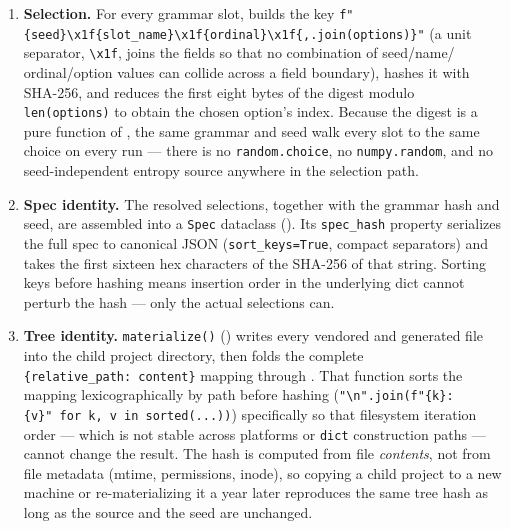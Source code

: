 \documentclass[
]{article}
\providecommand{\tightlist}{%
  \setlength{\itemsep}{0pt}\setlength{\parskip}{0pt}}
\begin{document}
\begin{enumerate}
\def\labelenumi{\arabic{enumi}.}
\tightlist
\item
  \textbf{Selection.} For every grammar slot,
   builds the key
  \texttt{f"\{seed\}\textbackslash{}x1f\{slot\_name\}\textbackslash{}x1f\{ordinal\}\textbackslash{}x1f\{\textquotesingle{},\textquotesingle{}.join(options)\}"}
  (a unit separator, \texttt{\textbackslash{}x1f}, joins the fields so
  that no combination of seed/name/ ordinal/option values can collide
  across a field boundary), hashes it with SHA-256, and reduces the
  first eight bytes of the digest modulo \texttt{len(options)} to obtain
  the chosen option's index. Because the digest is a pure function of
  , the same grammar and
  seed walk every slot to the same choice on every run --- there is no
  \texttt{random.choice}, no \texttt{numpy.random}, and no
  seed-independent entropy source anywhere in the selection path.
\item
  \textbf{Spec identity.} The resolved selections, together with the
  grammar hash and seed, are assembled into a \texttt{Spec} dataclass
  (). Its \texttt{spec\_hash} property
  serializes the full spec to canonical JSON (\texttt{sort\_keys=True},
  compact separators) and takes the first sixteen hex characters of the
  SHA-256 of that string. Sorting keys before hashing means insertion
  order in the underlying dict cannot perturb the hash --- only the
  actual selections can.
\item
  \textbf{Tree identity.} \texttt{materialize()}
  () writes every vendored and generated file
  into the child project directory, then folds the complete
  \texttt{\{relative\_path:\ content\}} mapping through
  . That
  function sorts the mapping lexicographically by path before hashing
  (\texttt{"\textbackslash{}n".join(f"\{k\}:\{v\}"\ for\ k,\ v\ in\ sorted(...))})
  specifically so that filesystem iteration order --- which is not
  stable across platforms or \texttt{dict} construction paths --- cannot
  change the result. The hash is computed from file \emph{contents}, not
  from file metadata (mtime, permissions, inode), so copying a child
  project to a new machine or re-materializing it a year later
  reproduces the same tree hash as long as the source and the seed are
  unchanged.
\end{enumerate}
\end{document}

